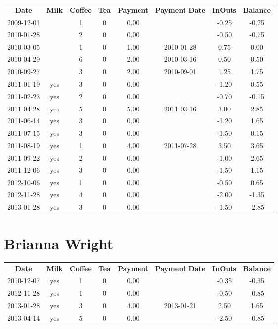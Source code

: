 \begin{center}
\begin{tabular}{cccccccc}
\textbf{Date} & \textbf{Milk} & \textbf{Coffee} & \textbf{Tea} & \textbf{Payment} & \textbf{Payment Date} & \textbf{InOuts} & \textbf{Balance} \\
2009-12-01 &  & 1 & 0 & 0.00 &  & -0.25 & -0.25\\ 
2010-01-28 &  & 2 & 0 & 0.00 &  & -0.50 & -0.75\\ 
2010-03-05 &  & 1 & 0 & 1.00 & 2010-01-28 &  0.75 &  0.00\\ 
2010-04-29 &  & 6 & 0 & 2.00 & 2010-03-16 &  0.50 &  0.50\\ 
2010-09-27 &  & 3 & 0 & 2.00 & 2010-09-01 &  1.25 &  1.75\\ 
2011-01-19 & yes & 3 & 0 & 0.00 &  & -1.20 &  0.55\\ 
2011-02-23 & yes & 2 & 0 & 0.00 &  & -0.70 & -0.15\\ 
2011-04-28 & yes & 5 & 0 & 5.00 & 2011-03-16 &  3.00 &  2.85\\ 
2011-06-14 & yes & 3 & 0 & 0.00 &  & -1.20 &  1.65\\ 
2011-07-15 & yes & 3 & 0 & 0.00 &  & -1.50 &  0.15\\ 
2011-08-19 & yes & 1 & 0 & 4.00 & 2011-07-28 &  3.50 &  3.65\\ 
2011-09-22 & yes & 2 & 0 & 0.00 &  & -1.00 &  2.65\\ 
2011-12-06 & yes & 3 & 0 & 0.00 &  & -1.50 &  1.15\\ 
2012-10-06 & yes & 1 & 0 & 0.00 &  & -0.50 &  0.65\\ 
2012-11-28 & yes & 4 & 0 & 0.00 &  & -2.00 & -1.35\\ 
2013-01-28 & yes & 3 & 0 & 0.00 &  & -1.50 & -2.85
\end{tabular}
\end{center}

\section{Brianna Wright}

\begin{center}
\begin{tabular}{cccccccc}
\textbf{Date} & \textbf{Milk} & \textbf{Coffee} & \textbf{Tea} & \textbf{Payment} & \textbf{Payment Date} & \textbf{InOuts} & \textbf{Balance} \\
2010-12-07 & yes & 1 & 0 & 0.00 &  & -0.35 & -0.35\\ 
2012-11-28 & yes & 1 & 0 & 0.00 &  & -0.50 & -0.85\\ 
2013-01-28 & yes & 3 & 0 & 4.00 & 2013-01-21 &  2.50 &  1.65\\ 
2013-04-14 & yes & 5 & 0 & 0.00 &  & -2.50 & -0.85
\end{tabular}
\end{center}

